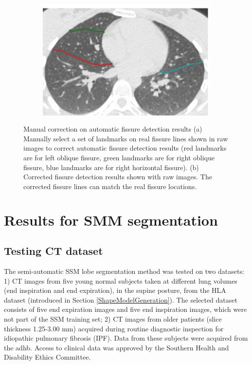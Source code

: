 {\begin{figure}[htbp]
\begin{subfigure}{.44\linewidth}
  \includegraphics[width=\linewidth,trim={{.0\wd0} {.0\wd0} {.0\wd0} {.0\wd0}},clip]{Segmentation/Image/AfterManualCorrection.png}
  \caption{}
  \label{fig:ManualCorrection-b} 
\end{subfigure}
\caption{Manual correction on automatic fissure detection results (a) Manually select a set of landmarks on real fissure lines shown in raw images to correct automatic fissure detection results (red landmarks are for left oblique fissure, green landmarks are for right oblique fissure, blue landmarks are for right horizontal fissure). (b) Corrected fissure detection results shown with raw images. The corrected fissure lines can match the real fissure locations.}
\label{fig:ManualCorrection}
\end{figure}

\section{Results for SMM segmentation} \label{SegmentationExperiment}

\subsection{Testing CT dataset}
The semi-automatic SSM lobe segmentation method was tested on two datasets: 1) CT images from five young normal subjects taken at different lung volumes (end inspiration and end expiration), in the supine posture, from the HLA dataset (introduced in Section \ref{ShapeModelGeneration}). The selected dataset consists of five end expiration images and five end inspiration images, which were not part of the SSM training set; 2) CT images from older patients (slice thickness 1.25-3.00 mm) acquired during routine diagnostic inspection for idiopathic pulmonary fibrosis (IPF). Data from these subjects were acquired from the \gls{adhb}. Access to clinical data was approved by the Southern Health and Disability Ethics Committee. 

}
